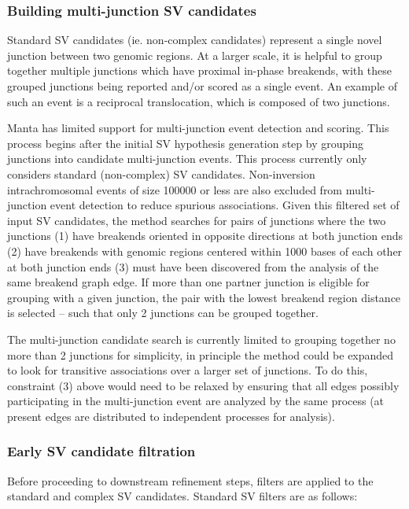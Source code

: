 \documentclass{article}
\begin{document}
\subsubsection{Building multi-junction SV candidates}

Standard SV candidates (ie. non-complex candidates) represent a single novel junction between two genomic regions. At a larger scale, it is helpful to group together multiple junctions which have proximal in-phase breakends, with these grouped junctions being reported and/or scored as a single event. An example of such an event is a reciprocal translocation, which is composed of two junctions.

Manta has limited support for multi-junction event detection and scoring. This process begins after the initial SV hypothesis generation step by grouping junctions into candidate multi-junction events. This process currently only considers standard (non-complex) SV candidates. Non-inversion intrachromosomal events of size 100000 or less are also excluded from multi-junction event detection to reduce spurious associations. Given this filtered set of input SV candidates, the method searches for pairs of junctions where the two junctions (1) have breakends oriented in opposite directions at both junction ends
(2) have breakends with genomic regions centered within 1000 bases of each other at both junction ends (3) must have been discovered from the analysis of the same breakend graph edge. If more than one partner junction is eligible for grouping with a given junction, the pair with the lowest breakend region distance is selected -- such that only 2 junctions can be grouped together.

The multi-junction candidate search is currently limited to grouping together no more than 2 junctions for simplicity, in principle the method could be expanded to look for transitive associations over a larger set of junctions. To do this, constraint (3) above would need to be relaxed by ensuring that all edges possibly participating in the multi-junction event are analyzed by the same process (at present edges are distributed to independent processes for analysis).

\subsubsection{Early SV candidate filtration}

Before proceeding to downstream refinement steps, filters are applied to the standard and complex SV candidates. Standard SV filters are as follows:
\end{document}
